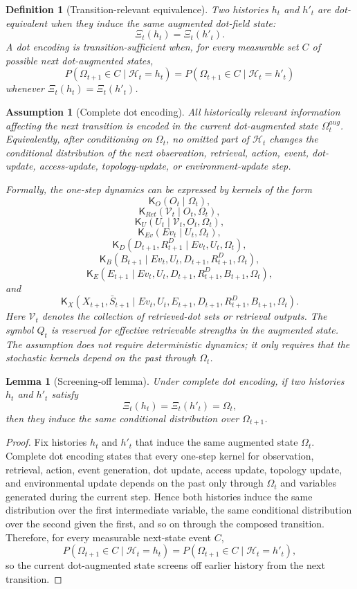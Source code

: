 \documentclass[11pt]{article}
\newtheorem{definition}{Definition}
\newtheorem{assumption}{Assumption}
\newtheorem{lemma}{Lemma}
\theoremstyle{remark}
\begin{document}
\begin{definition}[Transition-relevant equivalence]
Two histories $h_t$ and $h'_t$ are dot-equivalent when they induce the
same augmented dot-field state:
$$
\Xi_t(h_t)=\Xi_t(h'_t).
$$
A dot encoding is transition-sufficient when, for every measurable set
$C$ of possible next dot-augmented states,
$$
P(\Omega_{t+1}\in C\mid \mathcal{H}_t=h_t)
=
P(\Omega_{t+1}\in C\mid \mathcal{H}_t=h'_t)
$$
whenever $\Xi_t(h_t)=\Xi_t(h'_t)$.
\end{definition}

\begin{assumption}[Complete dot encoding]
All historically relevant information affecting the next transition is
encoded in the current dot-augmented state $\Omega_t^{aug}$. Equivalently,
after conditioning on $\Omega_t$, no omitted part of $\mathcal{H}_t$
changes the conditional distribution of the next observation, retrieval,
action, event, dot-update, access-update, topology-update, or
environment-update step.

Formally, the one-step dynamics can be expressed by kernels of the form
$$
\mathsf{K}_O(O_t\mid \Omega_t),
$$
$$
\mathsf{K}_{Ret}(\mathcal V_t\mid O_t,\Omega_t),
$$
$$
\mathsf{K}_{U}(U_t\mid \mathcal V_t,O_t,\Omega_t),
$$
$$
\mathsf{K}_{Ev}(Ev_t\mid U_t,\Omega_t),
$$
$$
\mathsf{K}_{D}(D_{t+1},R_{t+1}^D\mid Ev_t,U_t,\Omega_t),
$$
$$
\mathsf{K}_{B}(B_{t+1}\mid Ev_t,U_t,D_{t+1},R_{t+1}^D,\Omega_t),
$$
$$
\mathsf{K}_{E}(E_{t+1}\mid Ev_t,U_t,D_{t+1},R_{t+1}^D,B_{t+1},\Omega_t),
$$
and
$$
\mathsf{K}_{X}(X_{t+1},\bar S_{t+1}\mid Ev_t,U_t,E_{t+1},D_{t+1},R_{t+1}^D,B_{t+1},\Omega_t).
$$
Here $\mathcal V_t$ denotes the collection of retrieved-dot sets or retrieval outputs. The symbol $Q_t$ is reserved for effective retrievable strengths in the augmented state. The assumption does not require deterministic dynamics; it only requires that the stochastic kernels depend on the past through $\Omega_t$.
\end{assumption}

\begin{lemma}[Screening-off lemma]
Under complete dot encoding, if two histories $h_t$ and $h'_t$ satisfy
$$
\Xi_t(h_t)=\Xi_t(h'_t)=\Omega_t,
$$
then they induce the same conditional distribution over
$\Omega_{t+1}$.
\end{lemma}

\begin{proof}
Fix histories $h_t$ and $h'_t$ that induce the same augmented state $\Omega_t$. Complete dot encoding states that every one-step kernel for observation, retrieval, action, event generation, dot update, access update, topology update, and environmental update depends on the past only through $\Omega_t$ and variables generated during the current step. Hence both histories induce the same distribution over the first intermediate variable, the same conditional distribution over the second given the first, and so on through the composed transition. Therefore, for every measurable next-state event $C$,
$$
P(\Omega_{t+1}\in C\mid \mathcal{H}_t=h_t)
=
P(\Omega_{t+1}\in C\mid \mathcal{H}_t=h'_t),
$$
so the current dot-augmented state screens off earlier history from the next transition.
\end{proof}
\end{document}
